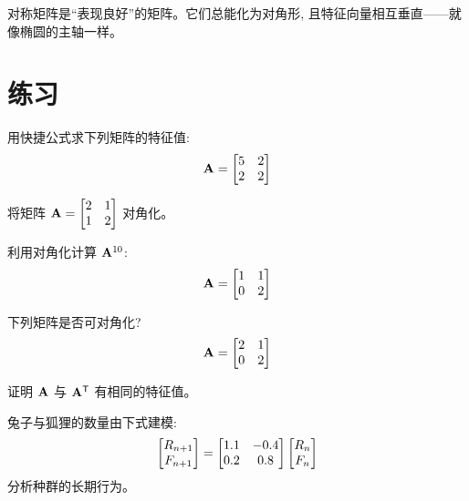 \begin{intuition}
对称矩阵是``表现良好''的矩阵。它们总能化为对角形, 且特征向量相互垂直——就像椭圆的主轴一样。
\end{intuition}

\section{练习}

\begin{exercise}
用快捷公式求下列矩阵的特征值:
\[
\mathbf{A} = \begin{bmatrix} 5 & 2 \\ 2 & 2 \end{bmatrix}
\]
\end{exercise}

\begin{exercise}
将矩阵 $\mathbf{A} = \begin{bmatrix} 2 & 1 \\ 1 & 2 \end{bmatrix}$ 对角化。
\end{exercise}

\begin{exercise}
利用对角化计算 $\mathbf{A}^{10}$:
\[
\mathbf{A} = \begin{bmatrix} 1 & 1 \\ 0 & 2 \end{bmatrix}
\]
\end{exercise}

\begin{exercise}
下列矩阵是否可对角化?
\[
\mathbf{A} = \begin{bmatrix} 2 & 1 \\ 0 & 2 \end{bmatrix}
\]
\end{exercise}

\begin{exercise}[挑战]
证明 $\mathbf{A}$ 与 $\mathbf{A}^{\mathsf{T}}$ 有相同的特征值。
\end{exercise}

\begin{problem}
兔子与狐狸的数量由下式建模:
\[
\begin{bmatrix} R_{n+1} \\ F_{n+1} \end{bmatrix} = \begin{bmatrix} 1.1 & -0.4 \\ 0.2 & 0.8 \end{bmatrix}\begin{bmatrix} R_n \\ F_n \end{bmatrix}
\]
分析种群的长期行为。
\end{problem}
